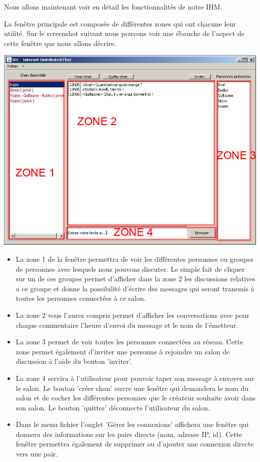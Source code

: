 \documentclass[french,11pt,a4]{article}
\begin{document}
Nous allons maintenant voir en détail les fonctionnalités de notre IHM.

La fenêtre principale est composée de différentes zones qui ont chacune leur utilité. Sur le screenshot suivant nous pouvons voir une ébauche de l'aspect de cette fenêtre que nous allons décrire.
\begin{center}
\includegraphics[width=15cm]{ImageSR1.jpg}
\end{center}
 
\begin{itemize}
\item{La zone 1 de la fenêtre permettra de voir les différentes
  personnes ou groupes de personnes avec lesquels nous pouvons
  discuter. Le simple fait de cliquer sur un de ces groupes permet
  d'afficher dans la zone 2 les discussions relatives a ce groupe et
  donne la possibilité d'écrire des messages qui seront transmis à
  toutes les personnes connectées à ce salon.}
\item{La zone 2 vous l'aurez compris permet d'afficher les conversations avec pour chaque commentaire l'heure d'envoi du message et le nom de l'émetteur.}

\item{La zone 3 permet de voir toutes les personnes connectées au réseau. Cette zone permet également d'inviter une personne à rejoindre un salon de discussion à l'aide du bouton 'inviter'.}

\item{La zone 4 servira à l'utilisateur pour pouvoir taper son message à envoyer sur le salon. Le bouton 'créer chan' ouvre une fenêtre qui demandera le nom du salon et de cocher les différentes personnes que le créateur souhaite avoir dans son salon. Le bouton 'quitter' déconnecte l'utilisateur du salon.}

\item{Dans le menu fichier l'onglet 'Gérer les connexions' affichera une fenêtre qui donnera des informations sur les pairs directs (nom, adresse IP, id). Cette fenêtre permettra également de supprimer ou d'ajouter une connexion directe vers une pair.}

\end{itemize}
\end{document}
